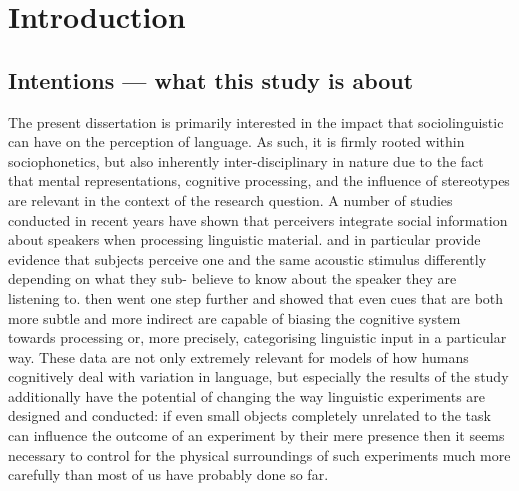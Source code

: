 \chapter{Introduction}
\label{ch.intro}

\section{Intentions --- what this study is about}
\label{sec.intro.intent}

The present dissertation is primarily interested in the impact that sociolinguistic  can have on the perception of language.
As such, it is firmly rooted within sociophonetics, but also inherently inter-disciplinary in nature due to the fact that mental representations, cognitive processing, and the influence of stereotypes are relevant in the context of the research question.
A number of studies conducted in recent years have shown that perceivers integrate social information about speakers when processing linguistic material.
\textcite{niedzielski1999} and \textcite{hayetal2006a} in particular provide evidence that subjects perceive one and the same acoustic stimulus differently depending on what they sub- believe to know about the speaker they are listening to.
\textcite{haydrager2010} then went one step further and showed that even cues that are both more subtle and more indirect are capable of biasing the cognitive system towards processing or, more precisely, categorising linguistic input in a particular way.
These data are not only extremely relevant for models of how humans cognitively deal with variation in language, but especially the results of the \citeyear{haydrager2010} study additionally have the potential of changing the way linguistic experiments are designed and conducted: if even small objects completely unrelated to the task can influence the outcome of an experiment by their mere presence then it seems necessary to control for the physical surroundings of such experiments much more carefully than most of us have probably done so far.

